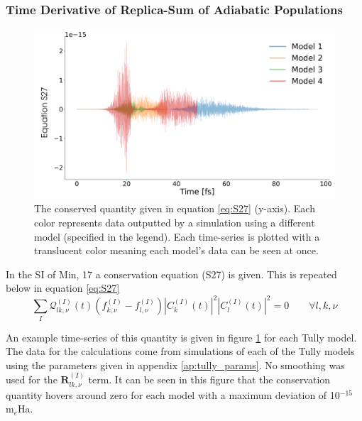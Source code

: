 \subsubsection{Time Derivative of Replica-Sum of Adiabatic Populations}
\begin{figure}[ht]
	\includegraphics[width=\textwidth]{../img/CTMQC/TullyModels/CTMQC_S27.png}
	\caption{\label{fig:S27}The conserved quantity given in equation \eqref{eq:S27} (y-axis). Each color represents data outputted by a simulation using a different model (specified in the legend). Each time-series is plotted with a translucent color meaning each model's data can be seen at once.}
\end{figure}

\noindent In the SI of Min, 17 \cite{min_ab_2017} a conservation equation (S27) is given. This is repeated below in equation \eqref{eq:S27}
\begin{equation}
	\sum_{I} \mathcal{Q}_{lk, \nu}^{(I)}(t) \left( f_{k, \nu}^{(I)} - f_{l, \nu}^{(I)} \right) |C_{k}^{(I)} (t)|^2 |C_{l}^{(I)} (t)|^2 = 0  \qquad \forall l, k, \nu
	\label{eq:S27}
\end{equation}

An example time-series of this quantity is given in figure \ref{fig:S27} for each Tully model. The data for the calculations come from simulations of each of the Tully models using the parameters given in appendix \ref{ap:tully_params}. No smoothing was used for the $\mathbf{R}_{lk, \nu}^{(I)}$ term. It can be seen in this figure that the conservation quantity hovers around zero for each model with a maximum deviation of 10$^{-15}$ m$_{e}$Ha.

